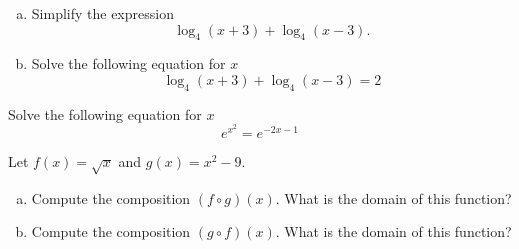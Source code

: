 \documentclass[12pt]{amsart}
\begin{document}
\newpage

\begin{thm}[20 Points]
  \begin{enumerate}[(a)]
  \item
    Simplify the expression 
    $$\log_4(x + 3) + \log_4(x - 3).$$
    \vspace{2in}
  \item
    Solve the following equation for $x$
    $$\log_4(x + 3) + \log_4(x - 3) = 2$$
    \vspace{1in}
  \end{enumerate}
\end{thm}

\begin{thm}[10 Points]
  Solve the following equation for $x$
  $$e^{x^2} = e^{-2x - 1}$$
\end{thm}

\newpage

\begin{thm}[8 Points]
  Let $f(x) = \sqrt{x}$ and $g(x) = x^2 - 9$.
  \begin{enumerate}[(a)]
  \item
    Compute the composition $(f \circ g)(x)$.
    What is the domain of this function?
    \vspace{3.5in}
  \item
    Compute the composition $(g \circ f)(x)$.
    What is the domain of this function?
  \end{enumerate}
\end{thm}
\end{document}
